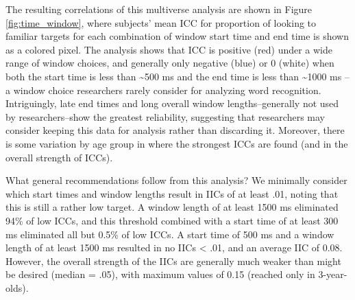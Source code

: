 \documentclass[10pt, letterpaper]{article}
\begin{document}
The resulting correlations of this multiverse analysis are shown in
Figure \ref{fig:time_window}, where subjects' mean ICC for proportion of
looking to familiar targets for each combination of window start time
and end time is shown as a colored pixel. The analysis shows that ICC is
positive (red) under a wide range of window choices, and generally only
negative (blue) or 0 (white) when both the start time is less than
\textasciitilde500 ms and the end time is less than \textasciitilde1000
ms -- a window choice researchers rarely consider for analyzing word
recognition. Intriguingly, late end times and long overall window
lengths--generally not used by researchers--show the greatest
reliability, suggesting that researchers may consider keeping this data
for analysis rather than discarding it. Moreover, there is some
variation by age group in where the strongest ICCs are found (and in the
overall strength of ICCs).

What general recommendations follow from this analysis? We minimally
consider which start times and window lengths result in IICs of at least
.01, noting that this is still a rather low target. A window length of
at least 1500 ms eliminated 94\% of low ICCs, and this threshold
combined with a start time of at least 300 ms eliminated all but 0.5\%
of low ICCs. A start time of 500 ms and a window length of at least 1500
ms resulted in no IICs \textless{} .01, and an average IIC of 0.08.
However, the overall strength of the IICs are generally much weaker than
might be desired (median = .05), with maximum values of 0.15 (reached
only in 3-year-olds).
\end{document}
